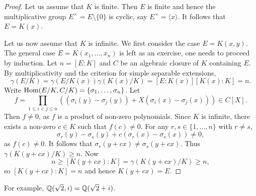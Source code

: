 \begin{proof}
    Let us assume that $K$ is finite. Then $E$ is finite and hence 
    the multiplicative group $E^{\times}=E\setminus\{0\}$ 
    is cyclic, say $E^{\times}=\langle x\rangle$. It follows
    that $E=K(x)$. 
    
    Let us now assume that $K$ is infinite. We first consider the case 
    $E=K(x,y)$. The general case $E=K(x_1,\dots,x_n)$ is left as an exercise, one needs to proceed by induction. 
    Let $n=[E:K]$ and 
    $C$ be an algebraic closure of $K$ containing $E$. 
    By multiplicativity and the criterion for simple separable extensions,
    \[
        \gamma(E/K)=\gamma(E/K(x))\gamma(K(x)/K)
        =[E:K(x)][K(x):K]=n.
    \]
    Write $\operatorname{Hom}(E/K,C/K)=\{\sigma_1,\dots,\sigma_n\}$. Let 
    \[
    f=\prod_{1\leq i<j\leq n}\left((\sigma_i(y)-\sigma_j(y))
    +X(\sigma_i(x)-\sigma_j(x))\right)\in C[X].
    \]
    Then $f\ne 0$, as $f$ is a product of non-zero polynomials. Since $K$ is infinite, 
    there exists a non-zero 
    $c\in K$ such that $f(c)\ne 0$. For any $r,s\in\{1,\dots,n\}$ with 
    $r\ne s$,
    \[
        \sigma_r(y)-\sigma_s(y)+c(\sigma_r(x)-\sigma_s(x))\ne 0,
    \]
    as $f(c)\ne0$. It follows that $\sigma_r(y+cx)\ne\sigma_s(y+cx)$. Thus $\gamma(K(y+cx)/K)\geq n$. 
    Now 
    \[
    n\geq [K(y+cx):K]=\gamma(K(y+cx)/K)\geq n,
    \]
    so $[K(y+cx):K]=n$ and
    hence $K(y+cx)=E$. 
\end{proof}

For example, $\mathbb{Q}(\sqrt{2},i)=\mathbb{Q}(\sqrt{2}+i)$. 
